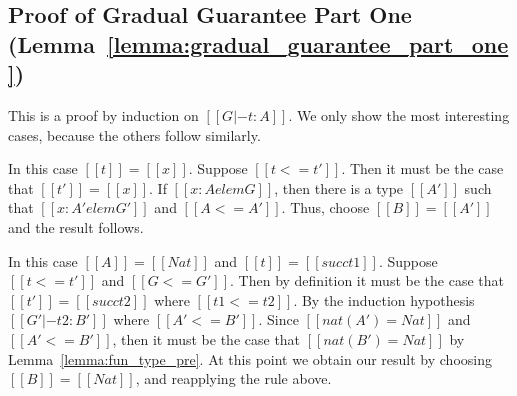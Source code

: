 \subsection{Proof of Gradual Guarantee Part One (Lemma~\ref{lemma:gradual_guarantee_part_one})}
\label{subsec:proof_of_gradual_guarantee_part_one_lemma:gradual_guarantee_part_one}

  This is a proof by induction on $[[G |- t : A]]$.  We only show the
most interesting cases, because the others follow similarly.

\begin{description}
\item[]
\item

\noindent
In this case $[[t]] = [[x]]$.  Suppose $[[t <= t']]$.  Then
it must be the case that $[[t']] = [[x]]$.  If $[[x : A elem G]]$,
then there is a type $[[A']]$ such that $[[x : A' elem G']]$ and
$[[A <= A']]$.  Thus, choose $[[B]] = [[A']]$ and the result follows.

\item[]
\item 

  \noindent
  In this case $[[A]] = [[Nat]]$ and $[[t]] = [[succ t1]]$.  Suppose $[[t <= t']]$ and $[[G <= G']]$.
  Then by definition it must be the case that $[[t']] = [[succ t2]]$ where $[[t1 <= t2]]$.
  By the induction hypothesis $[[G' |- t2 : B']]$ where $[[A' <= B']]$.  Since $[[nat(A') = Nat]]$
  and $[[A' <= B']]$, then it must be the case that $[[nat(B') = Nat]]$ by Lemma~\ref{lemma:fun_type_pre}.
  At this point we obtain our result by choosing $[[B]] = [[Nat]]$, and reapplying the rule above.

\item[]
\item
  \begin{typeProofCase}
  \end{typeProofCase}
      

\end{description}
